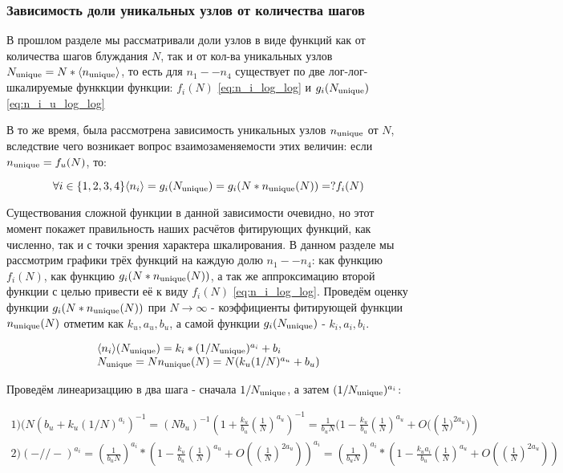 \subsubsection{Зависимость доли уникальных узлов от количества шагов}

В прошлом разделе мы рассматривали доли узлов в виде функций как от количества шагов блуждания $N$, так и от кол-ва уникальных узлов $N_{\textup{unique}} = N * \langle n_{\textup{unique}} \rangle$, то есть для $n_1 -- n_4$ существует по две лог-лог-шкалируемые функкции функции: $f_i(N)$ \ref{eq:n_i_log_log} и $g_i(N_{\textup{unique}})$ \ref{eq:n_i_u_log_log}

В то же время, была рассмотрена зависимость уникальных узлов $n_{\textup{unique}}$ от $N$, вследствие чего возникает вопрос взаимозаменяемости этих величин: если $n_{\textup{unique}} = f_u(N)$, то:

\[ \forall i \in \{1,2,3,4\} \langle n_i \rangle = g_i(N_{\textup{unique}}) = g_i(N * n_{\textup{unique}}(N))  =? f_i(N) \]

Существования сложной функции в данной зависимости очевидно, но этот момент покажет правильность наших расчётов фитирующих функций, как численно, так и с точки зрения характера шкалирования.
В данном разделе мы рассмотрим графики трёх функций на каждую долю $n_1 -- n_4$: как функцию $f_i(N)$, как функцию $g_i(N*n_{\textup{unique}}(N))$, а так же аппроксимацию второй функции с целью привести её к виду $f_i(N)$ \ref{eq:n_i_log_log}.
Проведём оценку функции $g_i(N*n_{\textup{unique}}(N))$ при $N \to \infty$ - коэффициенты фитирующей функции $n_{\textup{unique}}(N)$ отметим как $k_u, a_u, b_u$, а самой функции $g_i(N_{\textup{unique}})$ - $k_i, a_i, b_i$.

\begin{large}
\begin{equation*}
\begin{array}{l}
\langle n_i \rangle (N_{\textup{unique}}) = k_i * (1/N_{\textup{unique}})^{a_i} + b_i \\
N_{\textup{unique}} = N n_{\textup{unique}}(N) = N (k_u (1/N)^{a_u} + b_u) \\
\end{array}
\end{equation*}	
\end{large}

Проведём линеаризаццию в два шага - сначала $1/N_{\textup{unique}}$, а затем $(1/N_{\textup{unique}})^{a_i}$:

\begin{large}
\begin{equation*}
\begin{array}{l}
1) (N (b_u + k_u(1/N)^{a_i})^{-1} = ( N b_u)^{-1} (1 + \frac{k_u}{b_u} (\frac{1}{N})^{a_u})^{-1} = \frac{1}{b_u N} (1 - \frac{k_u}{b_u} (\frac{1}{N})^{a_u} + O(\left(\frac{1}{N})^{2a_u})\right) \\

2) ( - // - )^{a_i}  = (\frac{1}{b_u N})^{a_i} * (1 - \frac{k_u}{b_u} (\frac{1}{N})^{a_u} + O(\left(\frac{1}{N}\right)^{2a_u}))^{a_i} =  (\frac{1}{b_u N})^{a_i} * (1 - \frac{k_u a_i}{b_u} (\frac{1}{N})^{a_u} + O(\left(\frac{1}{N}\right)^{2a_u}))
\end{array}
\end{equation*}
\end{large}


